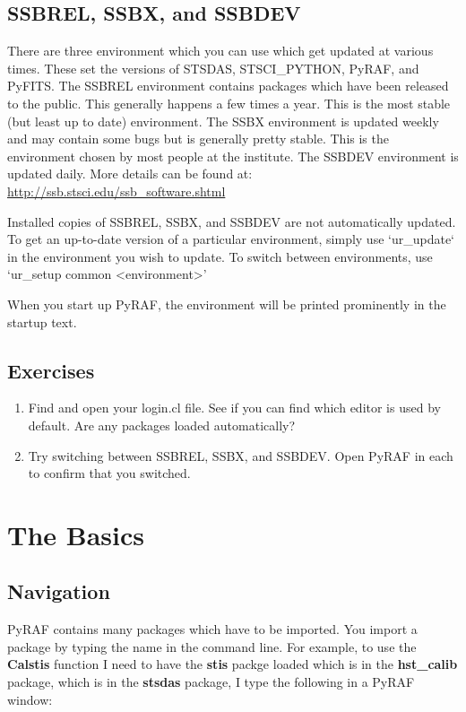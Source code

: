 \subsection{SSBREL, SSBX, and SSBDEV}
There are three environment which you can use which get updated at various times. These set the versions of STSDAS, STSCI\_PYTHON, PyRAF, and PyFITS. The SSBREL environment contains packages which have been released to the public. This generally happens a few times a year. This is the most stable (but least up to date) environment. The SSBX environment is updated weekly and may contain some bugs but is generally pretty stable. This is the environment chosen by most people at the institute. The SSBDEV environment is updated daily. More details can be found at: \url{http://ssb.stsci.edu/ssb_software.shtml}

Installed copies of SSBREL, SSBX, and SSBDEV are not automatically updated.  To get an up-to-date version of a particular environment, simply use `ur\_update` in the environment you wish to update.  To switch between environments, use `ur\_setup common <environment>'

When you start up PyRAF, the environment will be printed prominently in the startup text.

\subsection{Exercises}
\begin{enumerate}
\item Find and open your login.cl file.  See if you can find which editor is used by default. Are any packages loaded automatically? 
\item Try switching between SSBREL, SSBX, and SSBDEV. Open PyRAF in each to confirm that you switched.
\end{enumerate}

\section{The Basics}
\subsection{Navigation}
PyRAF contains many packages which have to be imported. You import a package by typing the name in the command line. For example, to use the {\bf Calstis} function I need to have the {\bf stis} packge loaded which is in the {\bf hst\_calib} package, which is in the {\bf stsdas} package,  I type the following in a PyRAF window:

